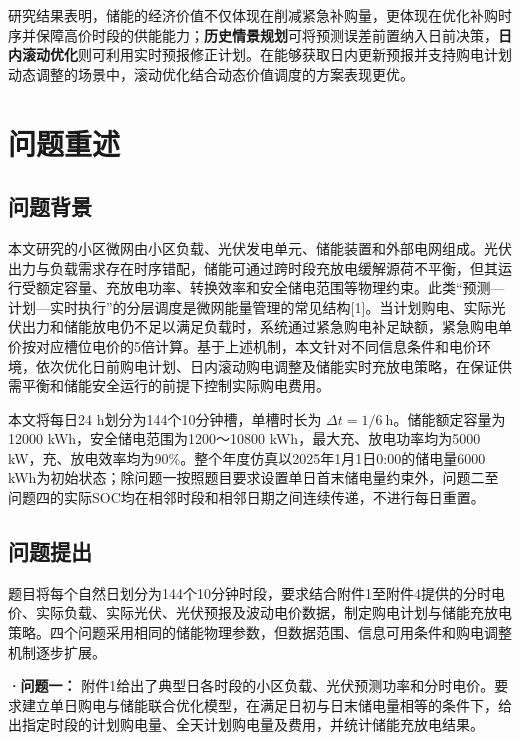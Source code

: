 \documentclass[zihao=-4,a4paper,UTF8,fontset=none]{ctexart}
\begin{document}
\begin{cumcmabstract}
研究结果表明，储能的经济价值不仅体现在削减紧急补购量，更体现在优化补购时序并保障高价时段的供能能力；\textbf{历史情景规划}可将预测误差前置纳入日前决策，\textbf{日内滚动优化}则可利用实时预报修正计划。在能够获取日内更新预报并支持购电计划动态调整的场景中，滚动优化结合动态价值调度的方案表现更优。

\end{cumcmabstract}
\section{问题重述}\label{ux95eeux9898ux91cdux8ff0}

\subsection{问题背景}\label{ux95eeux9898ux80ccux666f}

本文研究的小区微网由小区负载、光伏发电单元、储能装置和外部电网组成。光伏出力与负载需求存在时序错配，储能可通过跨时段充放电缓解源荷不平衡，但其运行受额定容量、充放电功率、转换效率和安全储电范围等物理约束。此类``预测---计划---实时执行''的分层调度是微网能量管理的常见结构{[}1{]}。当计划购电、实际光伏出力和储能放电仍不足以满足负载时，系统通过紧急购电补足缺额，紧急购电单价按对应槽位电价的5倍计算。基于上述机制，本文针对不同信息条件和电价环境，依次优化日前购电计划、日内滚动购电调整及储能实时充放电策略，在保证供需平衡和储能安全运行的前提下控制实际购电费用。

本文将每日24 h划分为144个10分钟槽，单槽时长为 \(\Delta t=1/6\ \mathrm h\)。储能额定容量为12000 kWh，安全储电范围为1200～10800 kWh，最大充、放电功率均为5000 kW，充、放电效率均为90\%。整个年度仿真以2025年1月1日0:00的储电量6000 kWh为初始状态；除问题一按照题目要求设置单日首末储电量约束外，问题二至问题四的实际SOC均在相邻时段和相邻日期之间连续传递，不进行每日重置。

\subsection{问题提出}\label{ux95eeux9898ux63d0ux51fa}

题目将每个自然日划分为144个10分钟时段，要求结合附件1至附件4提供的分时电价、实际负载、实际光伏、光伏预报及波动电价数据，制定购电计划与储能充放电策略。四个问题采用相同的储能物理参数，但数据范围、信息可用条件和购电调整机制逐步扩展。

\textbf{·问题一：} 附件1给出了典型日各时段的小区负载、光伏预测功率和分时电价。要求建立单日购电与储能联合优化模型，在满足日初与日末储电量相等的条件下，给出指定时段的计划购电量、全天计划购电量及费用，并统计储能充放电结果。
\end{document}
